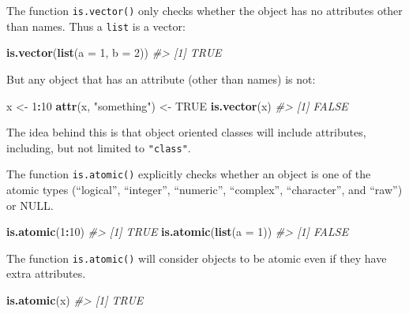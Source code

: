 \documentclass[]{book}
\newenvironment{Shaded}{\begin{snugshade}}{\end{snugshade}}
\newcommand{\CommentTok}[1]{\textcolor[rgb]{0.56,0.35,0.01}{\textit{#1}}}
\newcommand{\DataTypeTok}[1]{\textcolor[rgb]{0.13,0.29,0.53}{#1}}
\newcommand{\DecValTok}[1]{\textcolor[rgb]{0.00,0.00,0.81}{#1}}
\newcommand{\KeywordTok}[1]{\textcolor[rgb]{0.13,0.29,0.53}{\textbf{#1}}}
\newcommand{\NormalTok}[1]{#1}
\newcommand{\OperatorTok}[1]{\textcolor[rgb]{0.81,0.36,0.00}{\textbf{#1}}}
\newcommand{\OtherTok}[1]{\textcolor[rgb]{0.56,0.35,0.01}{#1}}
\newcommand{\StringTok}[1]{\textcolor[rgb]{0.31,0.60,0.02}{#1}}
\theoremstyle{plain}
\theoremstyle{remark}
\begin{document}
The function \texttt{is.vector()} only checks whether the object has no
attributes other than names. Thus a \texttt{list} is a vector:

\begin{Shaded}
\begin{Highlighting}[]
\KeywordTok{is.vector}\NormalTok{(}\KeywordTok{list}\NormalTok{(}\DataTypeTok{a =} \DecValTok{1}\NormalTok{, }\DataTypeTok{b =} \DecValTok{2}\NormalTok{))}
\CommentTok{#> [1] TRUE}
\end{Highlighting}
\end{Shaded}

But any object that has an attribute (other than names) is not:

\begin{Shaded}
\begin{Highlighting}[]
\NormalTok{x <-}\StringTok{ }\DecValTok{1}\OperatorTok{:}\DecValTok{10}
\KeywordTok{attr}\NormalTok{(x, }\StringTok{"something"}\NormalTok{) <-}\StringTok{ }\OtherTok{TRUE}
\KeywordTok{is.vector}\NormalTok{(x)}
\CommentTok{#> [1] FALSE}
\end{Highlighting}
\end{Shaded}

The idea behind this is that object oriented classes will include
attributes, including, but not limited to \texttt{"class"}.

The function \texttt{is.atomic()} explicitly checks whether an object is
one of the atomic types (``logical'', ``integer'', ``numeric'',
``complex'', ``character'', and ``raw'') or NULL.

\begin{Shaded}
\begin{Highlighting}[]
\KeywordTok{is.atomic}\NormalTok{(}\DecValTok{1}\OperatorTok{:}\DecValTok{10}\NormalTok{)}
\CommentTok{#> [1] TRUE}
\KeywordTok{is.atomic}\NormalTok{(}\KeywordTok{list}\NormalTok{(}\DataTypeTok{a =} \DecValTok{1}\NormalTok{))}
\CommentTok{#> [1] FALSE}
\end{Highlighting}
\end{Shaded}

The function \texttt{is.atomic()} will consider objects to be atomic
even if they have extra attributes.

\begin{Shaded}
\begin{Highlighting}[]
\KeywordTok{is.atomic}\NormalTok{(x)}
\CommentTok{#> [1] TRUE}
\end{Highlighting}
\end{Shaded}
\end{document}
